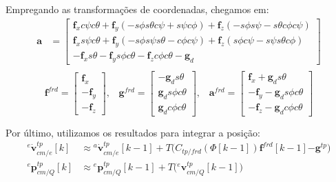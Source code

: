 Empregando as transformações de coordenadas, chegamos em:
\begin{align*}
    \mathbf{a} &=
    \begin{bmatrix}
        {{\mathbf{f}_{x}} {c\psi} {c\theta}}
        + {{\mathbf{f}_{y}} {\left( -{s\phi} {s\theta} {c\psi} + {s\psi} {c\phi} \right)}}
        + {{\mathbf{f}_{z}} {\left( -{s\phi} {s\psi} - {s\theta} {c\phi} {c\psi} \right)}} \\
        {{\mathbf{f}_{x}} {s\psi} {c\theta}}
        + {{\mathbf{f}_{y}} {\left(-{s\phi} {s\psi} {s\theta} - {c\phi} {c\psi} \right)}}
        + {{\mathbf{f}_{z}} {\left( {s\phi} {c\psi} - {s\psi} {s\theta} {c\phi} \right)}} \\
        - {{\mathbf{f}_{x}} {s\theta}}
        - {{\mathbf{f}_{y}} {s\phi} {c\theta}}
        - {{\mathbf{f}_{z}} {c\phi} {c\theta}}
        - {\mathbf{g}_{d}} 
    \end{bmatrix}  \\
\end{align*}
\begin{equation*}
    \mathbf{f}^{frd} =
    \begin{bmatrix}
    {\mathbf{f}_{x}} \\
    -{\mathbf{f}_{y}} \\
    -{\mathbf{f}_{z}}
    \end{bmatrix}
    \text{,}\quad
    \mathbf{g}^{frd} =
    \begin{bmatrix}
    -{{\mathbf{g}_{d}} {s\theta}} \\
    {{\mathbf{g}_{d}} {s\phi} {c\theta}} \\
    {{\mathbf{g}_{d}} {c\phi} {c\theta}}
    \end{bmatrix}
    \text{,}\quad
    \mathbf{a}^{frd} =
    \begin{bmatrix}
      {\mathbf{f}_{x}} + {{\mathbf{g}_{d}} {s\theta}} \\
    - {\mathbf{f}_{y}} - {{\mathbf{g}_{d}} {s\phi} {c\theta}} \\
    - {\mathbf{f}_{z}} - {{\mathbf{g}_{d}} {c\phi} {c\theta} }
    \end{bmatrix}
\end{equation*}


Por último, utilizamos os resultados para integrar a posição:
\begin{align*}
    {^{e}{\dot{\mathbf{v}}}^{tp}_{cm/e}{\left[k\right]}}
        &\approx {^{a}{\dot{\mathbf{v}}}^{tp}_{cm/e}}{\left[ k-1 \right]}
        + T \Big( {C_{tp/frd}\left({\Phi}{\left[ k-1 \right]} \right)} {{\mathbf{f}}^{frd}\left[k-1\right]} {-{\mathbf{g}}^{tp}} \Big) \\
    {^{e}{\mathbf{p}^{tp}_{cm/Q}}\left[k\right]}
    &\approx     {^{e}{\mathbf{p}^{tp}_{cm/Q}}\left[k-1\right]}
    + T \Big( {^{e}\mathbf{v}^{tp}_{cm/Q}{\left[ k-1 \right]}} \Big) \\
\end{align*}


